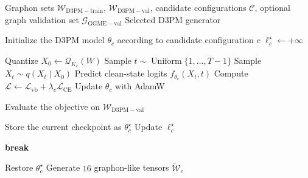 \begin{algorithm}[H]
    \caption{D3PM training and candidate selection}
    \label{alg:d3pm_candidate_selection}
    \begin{algorithmic}[1]
    
    \Require Graphon sets
             $\mathcal{W}_{\mathrm{D3PM-train}}$,
             $\mathcal{W}_{\mathrm{D3PM-val}}$,
             candidate configurations $\mathcal{C}$,
             optional graph validation set
             $\mathcal{G}_{\mathrm{GGME-val}}$
    \Ensure Selected D3PM generator
    
    
        \State Initialize the D3PM model $\theta_c$
               according to candidate configuration $c$
        \State $\ell_c^\star \gets +\infty$
    
    
    
                \State Quantize
                       $X_0 \gets \mathcal{Q}_{K_c}(W)$
                \State Sample
                       $t \sim \operatorname{Uniform}\{1,\ldots,T-1\}$
                \State Sample
                       $X_t \sim q(X_t\mid X_0)$
                \State Predict clean-state logits
                       $f_{\theta_c}(X_t,t)$
                \State Compute
                       $\mathcal{L}
                       \gets
                       \mathcal{L}_{\mathrm{vb}}
                       +
                       \lambda_c\mathcal{L}_{\mathrm{CE}}$
                \State Update $\theta_c$ with AdamW
    
            \EndFor
    
            \State Evaluate the objective on
                   $\mathcal{W}_{\mathrm{D3PM-val}}$
    
                \State Store the current checkpoint as $\theta_c^\star$
                \State Update $\ell_c^\star$
            \EndIf
    
                \State \textbf{break}
            \EndIf
    
        \EndFor
    
        \State Restore $\theta_c^\star$
        \State Generate $16$ graphon-like tensors
               $\widetilde{\mathcal{W}}_c$
    

\end{algorithmic}
\end{algorithm}
